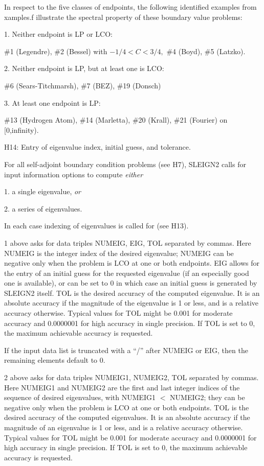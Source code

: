 \documentclass[12pt]{amsart}%
\theoremstyle{plain}
\numberwithin{equation}{section}
\numberwithin{theorem}{section}
\begin{document}
In respect to the five classes of endpoints, the following identified examples
from xamples.f illustrate the spectral property of these boundary value problems:

1. Neither endpoint is LP or LCO:

\#1 (Legendre), \#2 (Bessel) with $-1/4<C<3/4,$ \#4 (Boyd), \#5 (Latzko).

2. Neither endpoint is LP, but at least one is LCO:

\#6 (Sears-Titchmarsh), \#7 (BEZ), \#19 (Donsch)

3. At least one endpoint is LP:

\#13 (Hydrogen Atom), \#14 (Marletta), \#20 (Krall), \#21 (Fourier) on [0,infinity).

\medskip

H14: Entry of eigenvalue index, initial guess, and tolerance.

For all self-adjoint boundary condition problems (see H7), SLEIGN2 calls for
input information options to compute \textit{either}

1. a single eigenvalue, \textit{or}

2. a series of eigenvalues.

\noindent In each case indexing of eigenvalues is called for (see H13).

1 above asks for data triples NUMEIG, EIG, TOL separated by commas. Here
NUMEIG is the integer index of the desired eigenvalue; NUMEIG can be negative
only when the problem is LCO at one or both endpoints. EIG allows for the
entry of an initial guess for the requested eigenvalue (if an especially good
one is available), or can be set to 0 in which case an initial guess is
generated by SLEIGN2 itself. TOL is the desired accuracy of the computed
eigenvalue. It is an absolute accuracy if the magnitude of the eigenvalue is 1
or less, and is a relative accuracy otherwise. Typical values for TOL might be
0.001 for moderate accuracy and 0.0000001 for high accuracy in single
precision. If TOL is set to 0, the maximum achievable accuracy is requested.

If the input data list is truncated with a ``\thinspace/\thinspace'' after
NUMEIG or EIG, then the remaining elements default to 0.

2 above asks for data triples NUMEIG1, NUMEIG2, TOL separated by commas. Here
NUMEIG1 and NUMEIG2 are the first and last integer indices of the sequence of
desired eigenvalues, with NUMEIG1
$<$%
NUMEIG2; they can be negative only when the problem is LCO at one or both
endpoints. TOL is the desired accuracy of the computed eigenvalues. It is an
absolute accuracy if the magnitude of an eigenvalue is 1 or less, and is a
relative accuracy otherwise. Typical values for TOL might be 0.001 for
moderate accuracy and 0.0000001 for high accuracy in single precision. If TOL
is set to 0, the maximum achievable accuracy is requested.
\end{document}
